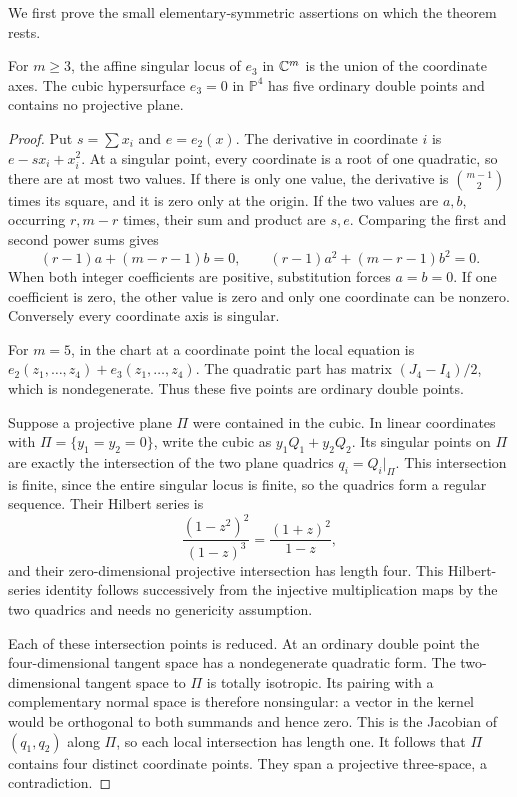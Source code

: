 We first prove the small elementary-symmetric assertions on which the theorem rests.
\begin{lemma}\label{lem:singular-e3}
For $m\geq3$, the affine singular locus of $e_3$ in $\mathbb C^m$ is the union of the coordinate axes. The cubic hypersurface $e_3=0$ in $\mathbb P^4$ has five ordinary double points and contains no projective plane.
\end{lemma}
\begin{proof}
Put $s=\sum x_i$ and $e=e_2(x)$. The derivative in coordinate $i$ is $e-sx_i+x_i^2$. At a singular point, every coordinate is a root of one quadratic, so there are at most two values. If there is only one value, the derivative is $\binom{m-1}{2}$ times its square, and it is zero only at the origin. If the two values are $a,b$, occurring $r,m-r$ times, their sum and product are $s,e$. Comparing the first and second power sums gives
\[
 (r-1)a+(m-r-1)b=0,
 \qquad (r-1)a^2+(m-r-1)b^2=0.
\]
When both integer coefficients are positive, substitution forces $a=b=0$. If one coefficient is zero, the other value is zero and only one coordinate can be nonzero. Conversely every coordinate axis is singular.

For $m=5$, in the chart at a coordinate point the local equation is $e_2(z_1,\ldots,z_4)+e_3(z_1,\ldots,z_4)$. The quadratic part has matrix $(J_4-I_4)/2$, which is nondegenerate. Thus these five points are ordinary double points.

Suppose a projective plane $\Pi$ were contained in the cubic. In linear coordinates with $\Pi=\{y_1=y_2=0\}$, write the cubic as $y_1Q_1+y_2Q_2$. Its singular points on $\Pi$ are exactly the intersection of the two plane quadrics $q_i=Q_i|_\Pi$. This intersection is finite, since the entire singular locus is finite, so the quadrics form a regular sequence. Their Hilbert series is
\[
 \frac{(1-z^2)^2}{(1-z)^3}=\frac{(1+z)^2}{1-z},
\]
and their zero-dimensional projective intersection has length four. This Hilbert-series identity follows successively from the injective multiplication maps by the two quadrics and needs no genericity assumption.

Each of these intersection points is reduced. At an ordinary double point the four-dimensional tangent space has a nondegenerate quadratic form. The two-dimensional tangent space to $\Pi$ is totally isotropic. Its pairing with a complementary normal space is therefore nonsingular: a vector in the kernel would be orthogonal to both summands and hence zero. This is the Jacobian of $(q_1,q_2)$ along $\Pi$, so each local intersection has length one. It follows that $\Pi$ contains four distinct coordinate points. They span a projective three-space, a contradiction.
\end{proof}

